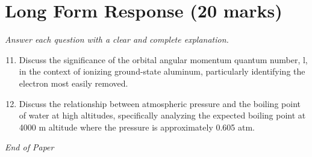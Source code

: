 \documentclass[12pt]{article}
\begin{document}
\section*{Long Form Response (20 marks)}
\textit{Answer each question with a clear and complete explanation.}
\begin{enumerate}[label=\arabic*.]
\setcounter{enumi}{10}
\item Discuss the significance of the orbital angular momentum quantum number, l, in the context of ionizing ground-state aluminum, particularly identifying the electron most easily removed.
\item Discuss the relationship between atmospheric pressure and the boiling point of water at high altitudes, specifically analyzing the expected boiling point at 4000 m altitude where the pressure is approximately 0.605 atm.
\end{enumerate}

\vfill
\noindent\textit{End of Paper}
\end{document}
